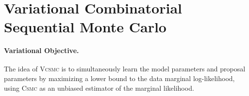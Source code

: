 \documentclass[accepted]{uai2021} %
\theoremstyle{definition}
\begin{document}
\iffalse
\begin{figure*}%
\centering
\begin{tikzpicture}[sloped]
\node (A) at (-7.5,0) {$A$};
\node (B) at (-6.5,0) {$B$};
\node (C) at (-5.5,0) {$C$};
\node (D) at (-4.5,0) {$D$};
\node (ab) at (-7.,1) {};
\node (cd) at (-5.,1) {};
\node (abcd) at (-6.,2) {};

\draw  (A) |- (ab.center);
\draw  (B) |- (ab.center);
\draw  (C) |- (cd.center);
\draw  (D) |- (cd.center);
\draw  (cd.center) |- (abcd.center);
\draw  (ab.center) |- (abcd.center);


\node (e) at (-3.5,0) {$A$};
\node (f) at (-2.5,0) {$B$};
\node (g) at (-1.5,0) {$C$};
\node (h) at (-.5,0) {$D$};
\node (ef) at (-3.,1) {};
\node (efg) at (-2.,2) {};
\node (efgh) at (-2.,3) {};


\draw  (e) |- (ef.center);
\draw  (f) |- (ef.center);
\draw  (g) |- (efg.center);
\draw  (h) |- (efgh.center);
\draw  (ef.center) |- (efg.center);
\draw  (efg.center) |- (efgh.center);

\node (i) at (.5,0) {$A$};
\node (j) at (1.5,0) {$B$};
\node (k) at (2.5,0) {$D$};
\node (l) at (3.5,0) {$C$};
\node (ij) at (1.,1) {};
\node (ijk) at (2.,2) {};
\node (ijkl) at (3.,3) {};

\draw  (i) |- (ij.center);
\draw  (j) |- (ij.center);
\draw  (k) |- (ijk.center);
\draw  (l) |- (ijkl.center);
\draw  (ij.center) |- (ijk.center);
\draw  (ijk.center) |- (ijkl.center);

\end{tikzpicture}
\caption{An example of the partial state $s = \{A,B\}$ for four taxa $\{A, B, C, D\}$ illustrated using its dual representation $\mathcal{D}(s)$. The dual state $\mathcal{D}(s)\subseteq \mathcal{T}$ corresponds to the three complete tree topologies.  (\text{left}): $\{ \{A,B\},\{C,D\}\}$ (\text{center}): $ \{\{A,B\}, \{A,B,C\}\}$ and (\text{right}): $ \{\{A,B\}, \{A,B,D\}\}$.}
\label{fig:dualphyhlo}
\end{figure*}
\fi








\section{Variational Combinatorial Sequential Monte Carlo}
\label{vcsmc}
\paragraph{Variational Objective.} 
The idea of \textsc{Vcsmc} is to simultaneously learn the model parameters and proposal parameters by maximizing a lower bound to the data marginal log-likelihood, using \textsc{Csmc} %
as an unbiased estimator of the marginal likelihood. 
\end{document}
